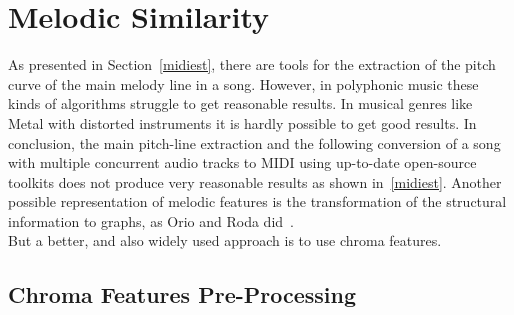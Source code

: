\section{Melodic Similarity}\label{melsimc}

As presented in Section~\ref{midiest}, there are tools for the extraction of the pitch curve of the main melody line in a song. However, in polyphonic music these kinds of algorithms struggle to get reasonable results. %
In musical genres like Metal with distorted instruments it is hardly possible to get good results. 
In conclusion, the main pitch-line extraction and the following conversion of a song with multiple concurrent audio tracks to MIDI using up-to-date open-source toolkits does not produce very reasonable results as shown in~\ref{midiest}.
Another possible representation of melodic features is the transformation of the structural information to graphs, as Orio and Roda did~\cite{graph1}.\\ 
But a better, and also widely used approach is to use chroma features.%

\subsection{Chroma Features Pre-Processing}\label{chromafeat}

